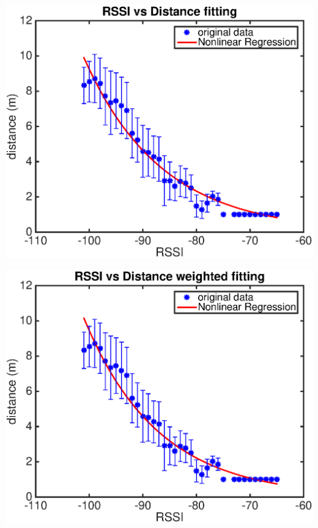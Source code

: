\documentclass[11pt]{beamer}
\begin{document}
\begin{frame}
\includegraphics[width=\textwidth]{outdoor_rssi_dis_fit.eps} 
\end{frame}


\begin{frame}
\includegraphics[width=\textwidth]{outdoor_rssi_dis_fit_weighted.eps} 
\end{frame}
\end{document}
